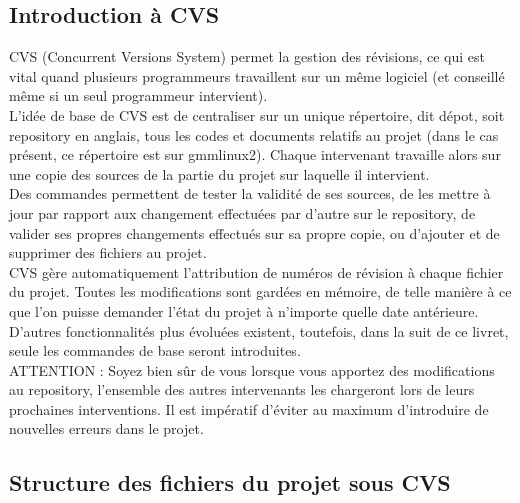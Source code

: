 \documentclass[12pt,a4paper]{../doc}
\begin{document}
{\subsection{Introduction \`a CVS}
  CVS (Concurrent Versions System) permet la gestion des r\'evisions, ce qui est vital quand plusieurs programmeurs travaillent sur un m\^eme logiciel (et conseill\'e m\^eme si un seul programmeur intervient).\\[0.4cm]
L'id\'ee de base de CVS est de centraliser sur un unique r\'epertoire, dit d\'epot, soit repository en anglais, tous les codes et documents relatifs au projet (dans le cas pr\'esent, ce r\'epertoire est sur gmmlinux2). Chaque intervenant travaille alors sur une copie des sources de la partie du projet sur laquelle il intervient.\\[0.4cm]
Des commandes permettent de tester la validit\'e de ses sources, de les mettre \`a jour par rapport aux changement effectu\'ees par d'autre sur le repository, de valider ses propres changements effectu\'es sur sa propre copie, ou d'ajouter et de supprimer des fichiers au projet.\\[0.4cm]
CVS g\`ere automatiquement l'attribution de num\'eros de r\'evision \`a chaque fichier du projet. Toutes les modifications sont gard\'ees en m\'emoire, de telle mani\`ere \`a ce que l'on puisse demander l'\'etat du projet \`a n'importe quelle date ant\'erieure. \\[0.4cm]
D'autres fonctionnalit\'es plus \'evolu\'ees existent, toutefois, dans la suit de ce livret, seule les commandes de base seront introduites.\\[0.4cm]
ATTENTION : Soyez bien s\^ur de vous lorsque vous apportez des modifications au repository, l'ensemble des autres intervenants les chargeront lors de leurs prochaines interventions. Il est imp\'eratif d'\'eviter au maximum d'introduire de nouvelles erreurs dans le projet. 

  
\subsection{Structure des fichiers du projet sous CVS}

}
\end{document}
